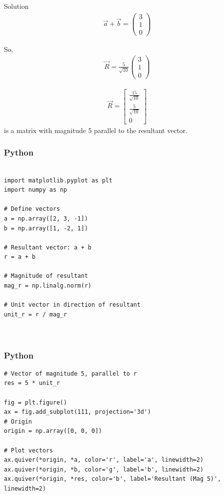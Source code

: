 \documentclass{beamer}
\begin{document}
\begin{frame}{Solution}
\begin{align}
\vec{a} + \vec{b} = \begin{pmatrix} 3 \\ 1 \\ 0 \end{pmatrix}
\end{align}

So,
\begin{align}
\boxed{
\vec{R} = \frac{5}{\sqrt{10}}
\begin{pmatrix}
3 \\
1 \\
0
\end{pmatrix}
}
\end{align}
    
\begin{align}
\vec{R} = \begin{bmatrix}
\frac{15}{\sqrt{10}} \\
\frac{5}{\sqrt{10}} \\
0
\end{bmatrix}
\end{align}
is a matrix with magnitude 5 parallel to the resultant vector.





\end{frame}


\begin{frame}[fragile]
    \frametitle{Python}
    \begin{lstlisting}

import matplotlib.pyplot as plt
import numpy as np

# Define vectors
a = np.array([2, 3, -1])
b = np.array([1, -2, 1])

# Resultant vector: a + b
r = a + b

# Magnitude of resultant
mag_r = np.linalg.norm(r)

# Unit vector in direction of resultant
unit_r = r / mag_r



\end{lstlisting}
\end{frame}


\begin{frame}[fragile]
    \frametitle{Python}
    \begin{lstlisting}    
# Vector of magnitude 5, parallel to r
res = 5 * unit_r

fig = plt.figure()
ax = fig.add_subplot(111, projection='3d')
# Origin
origin = np.array([0, 0, 0])

# Plot vectors
ax.quiver(*origin, *a, color='r', label='a', linewidth=2)
ax.quiver(*origin, *b, color='g', label='b', linewidth=2)
ax.quiver(*origin, *res, color='b', label='Resultant (Mag 5)', linewidth=2)





\end{lstlisting}
\end{frame}
\end{document}
